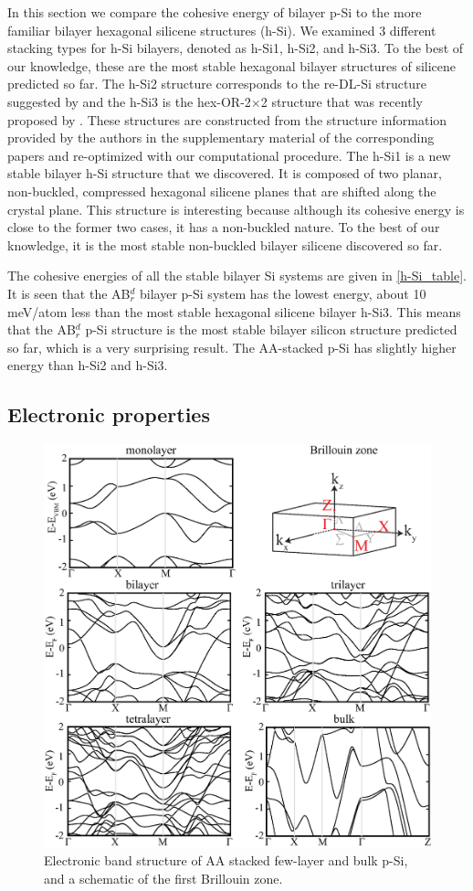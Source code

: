 In this section we compare the cohesive energy of bilayer p-Si to the more familiar bilayer hexagonal silicene structures (h-Si).  We examined 3 different stacking types for h-Si bilayers, denoted as h-Si1, h-Si2, and h-Si3. To the best of our knowledge, these are the most stable hexagonal bilayer structures of silicene predicted so far. The h-Si2 structure corresponds to the re-DL-Si structure suggested by \citet{Morishita2011} and the h-Si3 is the hex-OR-2$\times$2 structure that was recently proposed by \citet{Sakai2015}. These structures are constructed from the structure information provided by the authors in the supplementary material of the corresponding papers and re-optimized with our computational procedure. The h-Si1 is a new stable bilayer h-Si structure that we discovered. It is composed of two planar, non-buckled, compressed hexagonal silicene planes that are shifted along the crystal plane. This structure is interesting because although its cohesive energy is close to the former two cases, it has a non-buckled nature. To the best of our knowledge, it is the most stable non-buckled bilayer silicene discovered so far. 

The cohesive energies of all the stable bilayer Si systems are given in \autoref{h-Si_table}. It is seen that the AB$_r^d$ bilayer p-Si system has the lowest energy, about 10 meV/atom less than the most stable hexagonal silicene bilayer h-Si3.  This means that the AB$_r^d$ p-Si structure is the most stable bilayer silicon structure predicted so far, which is a very surprising result. The AA-stacked p-Si has slightly higher energy than h-Si2 and h-Si3.

\subsection{Electronic properties}\label{elec}

\begin{figure}[htb]
\centering
\includegraphics[width=0.8\linewidth]{ps_AA_bands.eps}%
\caption{Electronic band structure of AA stacked few-layer and bulk p-Si, and a schematic of the first Brillouin zone. \label{fig:AA_bands}}
\end{figure}

